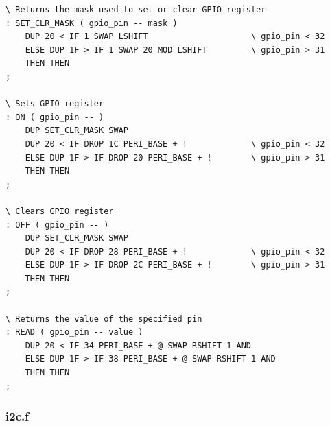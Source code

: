 \documentclass[]{article}
\begin{document}
\begin{verbatim}
\ Returns the mask used to set or clear GPIO register
: SET_CLR_MASK ( gpio_pin -- mask )
    DUP 20 < IF 1 SWAP LSHIFT                     \ gpio_pin < 32
    ELSE DUP 1F > IF 1 SWAP 20 MOD LSHIFT         \ gpio_pin > 31
    THEN THEN 
;

\ Sets GPIO register 
: ON ( gpio_pin -- )
    DUP SET_CLR_MASK SWAP
    DUP 20 < IF DROP 1C PERI_BASE + !             \ gpio_pin < 32
    ELSE DUP 1F > IF DROP 20 PERI_BASE + !        \ gpio_pin > 31
    THEN THEN 
;

\ Clears GPIO register 
: OFF ( gpio_pin -- )
    DUP SET_CLR_MASK SWAP
    DUP 20 < IF DROP 28 PERI_BASE + !             \ gpio_pin < 32
    ELSE DUP 1F > IF DROP 2C PERI_BASE + !        \ gpio_pin > 31
    THEN THEN 
;

\ Returns the value of the specified pin
: READ ( gpio_pin -- value )
    DUP 20 < IF 34 PERI_BASE + @ SWAP RSHIFT 1 AND 
    ELSE DUP 1F > IF 38 PERI_BASE + @ SWAP RSHIFT 1 AND 
    THEN THEN 
;
\end{verbatim}

\subsubsection{i2c.f}
\end{document}
